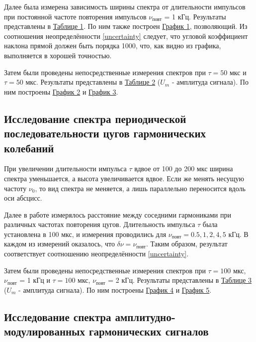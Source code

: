 \documentclass[15pt,a5paper,reqno]{article}
\begin{document}
        Далее была измерена зависимость ширины спектра от длительности импульсов при постоянной частоте повторения импульсов $\nu_{\text{повт}}$ = 1 кГц. Результаты представлены в \hyperlink{table_1}{Таблице 1}. По ним также построен \hyperlink{graph_1}{График 1}, позволяющий. Из соотношения неопределённости \eqref{uncertainty} следует, что угловой коэффициент наклона прямой должен быть порядка 1000, что, как видно из графика, выполняется в хорошей точностью.

        Затем были проведены непосредственные измерения спектров при $\tau = 50\text{ мкс}$ и $\tau = 50\text{ мкс}$. Результаты представлены в \hyperlink{table_2}{Таблице 2} ($U_m$ - амплитуда сигнала). По ним построены \hyperlink{graph_2}{График 2} и \hyperlink{graph_3}{График 3}.

    \subsection{Исследование спектра периодической последовательности цугов гармонических колебаний}

        При увеличении длительности импульса $\tau$ вдвое от 100 до 200 мкс ширина спектра уменьшается, а высота увеличивается вдвое. Если же менять несущую частоту $\nu_0$, то вид спектра не меняется, а лишь параллельно переносится вдоль оси абсцисс.

        Далее в работе измерялось расстояние между соседними гармониками при различных частотах повторения цугов. Длительность импульса $\tau$ была установлена в 100 мкс, и измерения проводились для $\nu_{\text{повт}} = 0.5, 1, 2, 4, 5$ кГц. В каждом из измерений оказалось, что $\delta\nu = \nu_{\text{повт}}$. Таким образом, результат соответствует соотношению неопределённости \eqref{uncertainty}.

        Затем были проведены непосредственные измерения спектров при $\tau = 100\text{ мкс}$, $\nu_{\text{повт}}$ = 1 кГц и $\tau = 100\text{ мкс}$, $\nu_{\text{повт}}$ = 2 кГц. Результаты представлены в \hyperlink{table_3}{Таблице 3} ($U_m$ - амплитуда сигнала). По ним построены \hyperlink{graph_4}{График 4} и \hyperlink{graph_5}{График 5}.

    \subsection{Исследование спектра амплитудно-модулированных гармонических сигналов}
\end{document}
